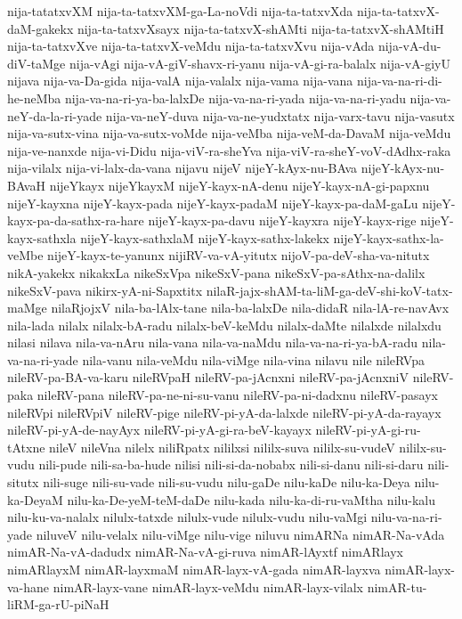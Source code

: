 {nija-tatatxvXM
nija-ta-tatxvXM-ga-La-noVdi
nija-ta-tatxvXda
nija-ta-tatxvX-daM-gakekx
nija-ta-tatxvXsayx
nija-ta-tatxvX-shAMti
nija-ta-tatxvX-shAMtiH
nija-ta-tatxvXve
nija-ta-tatxvX-veMdu
nija-ta-tatxvXvu
nija-vAda
nija-vA-du-diV-taMge
nija-vAgi
nija-vA-giV-shavx-ri-yanu
nija-vA-gi-ra-balalx
nija-vA-giyU
nijava
nija-va-Da-gida
nija-valA
nija-valalx
nija-vama
nija-vana
nija-va-na-ri-di-he-neMba
nija-va-na-ri-ya-ba-lalxDe
nija-va-na-ri-yada
nija-va-na-ri-yadu
nija-va-neY-da-la-ri-yade
nija-va-neY-duva
nija-va-ne-yudxtatx
nija-varx-tavu
nija-vasutx
nija-va-sutx-vina
nija-va-sutx-voMde
nija-veMba
nija-veM-da-DavaM
nija-veMdu
nija-ve-nanxde
nija-vi-Didu
nija-viV-ra-sheYva
nija-viV-ra-sheY-voV-dAdhx-raka
nija-vilalx
nija-vi-lalx-da-vana
nijavu
nijeV
nijeY-kAyx-nu-BAva
nijeY-kAyx-nu-BAvaH
nijeYkayx
nijeYkayxM
nijeY-kayx-nA-denu
nijeY-kayx-nA-gi-papxnu
nijeY-kayxna
nijeY-kayx-pada
nijeY-kayx-padaM
nijeY-kayx-pa-daM-gaLu
nijeY-kayx-pa-da-sathx-ra-hare
nijeY-kayx-pa-davu
nijeY-kayxra
nijeY-kayx-rige
nijeY-kayx-sathxla
nijeY-kayx-sathxlaM
nijeY-kayx-sathx-lakekx
nijeY-kayx-sathx-la-veMbe
nijeY-kayx-te-yanunx
nijiRV-va-vA-yitutx
nijoV-pa-deV-sha-va-nitutx
nikA-yakekx
nikakxLa
nikeSxVpa
nikeSxV-pana
nikeSxV-pa-sAthx-na-dalilx
nikeSxV-pava
nikirx-yA-ni-Sapxtitx
nilaR-jajx-shAM-ta-liM-ga-deV-shi-koV-tatx-maMge
nilaRjojxV
nila-ba-lAlx-tane
nila-ba-lalxDe
nila-didaR
nila-lA-re-navAvx
nila-lada
nilalx
nilalx-bA-radu
nilalx-beV-keMdu
nilalx-daMte
nilalxde
nilalxdu
nilasi
nilava
nila-va-nAru
nila-vana
nila-va-naMdu
nila-va-na-ri-ya-bA-radu
nila-va-na-ri-yade
nila-vanu
nila-veMdu
nila-viMge
nila-vina
nilavu
nile
nileRVpa
nileRV-pa-BA-va-karu
nileRVpaH
nileRV-pa-jAcnxni
nileRV-pa-jAcnxniV
nileRV-paka
nileRV-pana
nileRV-pa-ne-ni-su-vanu
nileRV-pa-ni-dadxnu
nileRV-pasayx
nileRVpi
nileRVpiV
nileRV-pige
nileRV-pi-yA-da-lalxde
nileRV-pi-yA-da-rayayx
nileRV-pi-yA-de-nayAyx
nileRV-pi-yA-gi-ra-beV-kayayx
nileRV-pi-yA-gi-ru-tAtxne
nileV
nileVna
nilelx
niliRpatx
nililxsi
nililx-suva
nililx-su-vudeV
nililx-su-vudu
nili-pude
nili-sa-ba-hude
nilisi
nili-si-da-nobabx
nili-si-danu
nili-si-daru
nili-situtx
nili-suge
nili-su-vade
nili-su-vudu
nilu-gaDe
nilu-kaDe
nilu-ka-Deya
nilu-ka-DeyaM
nilu-ka-De-yeM-teM-daDe
nilu-kada
nilu-ka-di-ru-vaMtha
nilu-kalu
nilu-ku-va-nalalx
nilulx-tatxde
nilulx-vude
nilulx-vudu
nilu-vaMgi
nilu-va-na-ri-yade
niluveV
nilu-velalx
nilu-viMge
nilu-vige
niluvu
nimARNa
nimAR-Na-vAda
nimAR-Na-vA-dadudx
nimAR-Na-vA-gi-ruva
nimAR-lAyxtf
nimARlayx
nimARlayxM
nimAR-layxmaM
nimAR-layx-vA-gada
nimAR-layxva
nimAR-layx-va-hane
nimAR-layx-vane
nimAR-layx-veMdu
nimAR-layx-vilalx
nimAR-tu-liRM-ga-rU-piNaH
}
